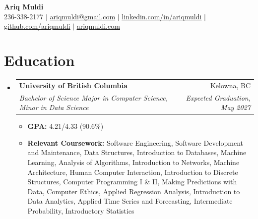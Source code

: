 \documentclass[letterpaper,11pt]{article}
\makeatletter
\newcommand{\resumeItem}[1]{
  \item\small{
    {#1 \vspace{-2pt}}
  }
}
\newcommand{\resumeSubheading}[4]{
  \vspace{-2pt}\item
    \begin{tabular*}{0.97\textwidth}[t]{l@{\extracolsep{\fill}}r}
      \textbf{#1} & #2 \\
      \textit{\small#3} & \textit{\small #4} \\
    \end{tabular*}\vspace{-7pt}
}
\newcommand{\resumeSubHeadingListStart}{\begin{itemize}[leftmargin=0.15in, label={}]}
\newcommand{\resumeSubHeadingListEnd}{\end{itemize}}
\newcommand{\resumeItemListStart}{\begin{itemize}}
\newcommand{\resumeItemListEnd}{\end{itemize}\vspace{-5pt}}
\makeatother
\begin{document}

\newcommand{\githubLink}[1]{\href{#1}{\textcolor{black}{\faGithub}}}

\begin{center}
	\textbf{\huge Ariq Muldi} \\ \vspace{1pt}
	\small 236-338-2177 $|$ \href{mailto:ariqmuldi@gmail.com}{\textcolor{sectionblue}{\underline{ariqmuldi@gmail.com}}} $|$ 
	\href{https://linkedin.com/in/ariqmuldi}{\textcolor{sectionblue}{\underline{linkedin.com/in/ariqmuldi}}} $|$
	\href{https://github.com/ariqmuldi}{\textcolor{sectionblue}{\underline{github.com/ariqmuldi}}} $|$
	\href{https://ariqmuldi.com}{\textcolor{sectionblue}{\underline{ariqmuldi.com}}}
\end{center}

\section{Education}
\resumeSubHeadingListStart
\resumeSubheading
{University of British Columbia}{\textcolor{sectionblue}{Kelowna, BC}}
{Bachelor of Science Major in Computer Science, Minor in Data Science}{Expected Graduation, May 2027}

\resumeItemListStart
\resumeItem{\textbf{GPA:} 4.21/4.33 (90.6\%)}

\resumeItem{\textbf{Relevant Coursework:} Software Engineering, Software Development and Maintenance, Data Structures,  Introduction to Databases, Machine Learning, Analysis of Algorithms, Introduction to Networks, Machine Architecture, Human Computer Interaction, Introduction to Discrete Structures, Computer Programming I \& II, Making Predictions with Data, Computer Ethics, Applied Regression Analysis, Introduction to Data Analytics, Applied Time Series and Forecasting, Intermediate Probability, Introductory Statistics}
\resumeItemListEnd

\resumeSubHeadingListEnd
\end{document}
